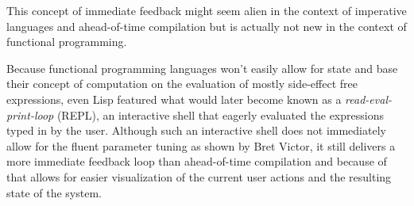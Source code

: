 This concept of immediate feedback might seem alien in the context
of imperative languages and ahead-of-time compilation but is actually
not new in the context of functional programming.


Because functional programming languages won't easily allow
for state and base their concept of computation on the evaluation of
mostly side-effect free expressions, even Lisp \cite{commonlisp90}
featured what would later become known as a \textit{read-eval-print-loop}
(REPL), an interactive shell that
eagerly evaluated the expressions typed in by the user. Although
such an interactive shell does not immediately allow for the fluent
parameter tuning as shown by Bret Victor, it still delivers a more
immediate feedback loop than ahead-of-time compilation
and because of that allows for easier visualization of the current
user actions and the resulting state of the system.



